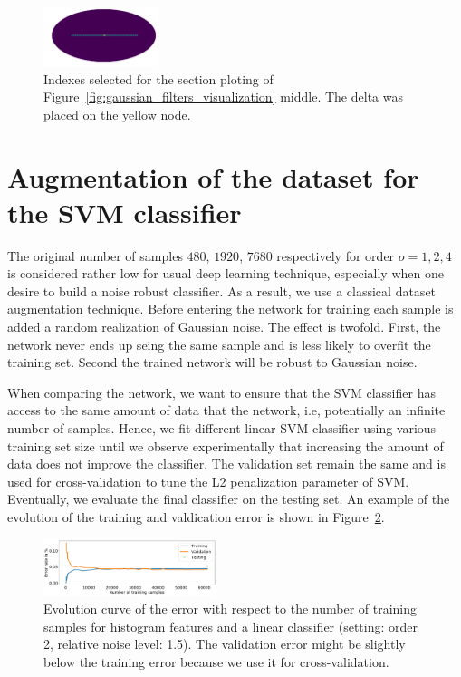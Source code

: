 \documentclass[final,twocolumn,3p,times,authoryear]{elsarticle}
\newcommand{\figref}[1]{Figure~\ref{fig:#1}}
\newcommand{\1}{\b{1}}              %
\newcommand{\0}{\b{0}}              %
\begin{document}
\begin{figure}[!ht]
\centering
\includegraphics[width=0.3\textwidth]{figures/index_plotting_order20_nside16.pdf}
\caption{Indexes selected for the section ploting of \figref{gaussian_filters_visualization} middle. The delta was placed on the yellow node.}
\label{fig:index_section}
\end{figure}

\section{Augmentation of the dataset for the SVM classifier}
\label{sec:dataset_augmentation} The original number of samples $480$, $1920$,
$7680$ respectively for order $o=1,2,4$ is considered rather low for usual
deep learning technique, especially when one desire to build a noise robust
classifier. As a result, we use a classical dataset augmentation technique.
Before entering the network for training each sample is added a random
realization of Gaussian noise. The effect is twofold. First, the network never
ends up seing the same sample and is less likely to overfit the training set.
Second the trained network will be robust to Gaussian noise.

When comparing the network, we want to ensure that the SVM classifier has
access to the same amount of data that the network, i.e, potentially an
infinite number of samples. Hence, we fit different linear SVM classifier using
various training set size until we observe experimentally that
increasing the amount of data does not improve the classifier. The validation
set remain the same and is used for cross-validation to tune the L2
penalization parameter of SVM. Eventually, we evaluate the final classifier on
the testing set. An example of the evolution of the training and valdication
error is shown in \figref{hist_error_evolution}.

\begin{figure}[!ht]
\centering
\includegraphics[width=0.45\textwidth]{figures/hist_error_order2_noise1_5.pdf}
\caption{Evolution curve of the error with respect to the number of training samples for histogram features and a linear classifier (setting: order 2, relative noise level: 1.5). The validation error might be slightly below the training error because we use it for cross-validation.}
\label{fig:hist_error_evolution}
\end{figure}
\end{document}
